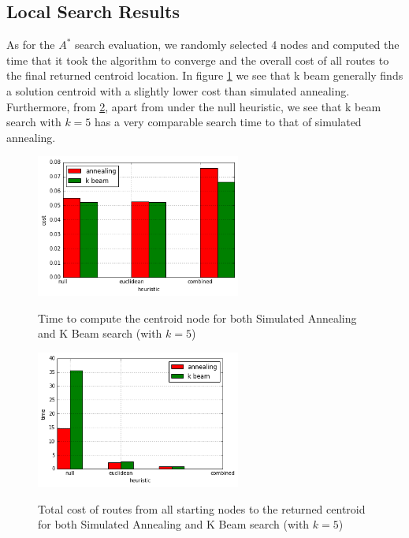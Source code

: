 \documentclass[11pt]{article}
\begin{document}
\subsection{Local Search Results}
As for the $A^{*}$ search evaluation, we randomly selected 4 nodes and computed the time that it took the algorithm to converge and the overall cost of all routes to the final returned centroid location. In figure \ref{sim_ann_and_k_beam_cost} we see that k beam generally finds a solution centroid with a slightly lower cost than simulated annealing. Furthermore, from \ref{sim_ann_and_k_beam_time}, apart from under the null heuristic, we see that k beam search with $k=5$ has a very comparable search time to that of simulated annealing.

\begin{figure}[H]
\center
\caption{Time to compute the centroid node for both Simulated Annealing and K Beam search (with $k = 5$)}
\includegraphics[width=0.6\textwidth]{../images/sim_ann_and_k_beam.png}
\label{sim_ann_and_k_beam_cost}
\end{figure}

\begin{figure}[H]
\center
\caption{Total cost of routes from all starting nodes to the returned centroid for both Simulated Annealing and K Beam search (with $k = 5$)}
\includegraphics[width=0.6\textwidth]{../images/sim_ann_and_k_beam_time.png}
\label{sim_ann_and_k_beam_time}
\end{figure}
\end{document}
